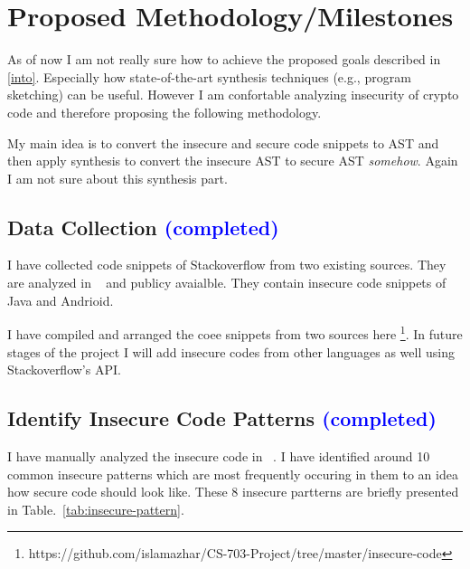 \documentclass[sigconf]{acmart}
\begin{document}
\section{Proposed Methodology/Milestones}
As of now I am not really sure how to achieve the proposed goals described in \cref{into}. Especially how state-of-the-art synthesis techniques (e.g., program sketching) can be useful. However I am confortable analyzing insecurity of crypto code and therefore proposing the following methodology. 

My main idea is to convert the insecure and secure code snippets to AST and then apply synthesis to convert the insecure AST to secure AST \textit{somehow}. Again I am not sure about this synthesis part.  

\subsection{Data Collection \textcolor{blue}{(completed)}} 
I have collected code snippets of Stackoverflow from two existing sources. They are analyzed in ~\cite{fischer2017stack, meng2018secure} and publicy avaialble. 
They contain insecure code snippets of Java and Andrioid. 

I have compiled and arranged the coee snippets from two sources here \footnote{https://github.com/islamazhar/CS-703-Project/tree/master/insecure-code}. In future stages of the project I will add insecure codes from other languages as well using Stackoverflow's API.

\subsection{Identify Insecure Code Patterns \textcolor{blue}{(completed)}}
I have manually analyzed the insecure code in ~\cite{fischer2017stack,meng2018secure}. I have identified around 10 common insecure patterns which are most frequently occuring in them to an idea how secure code should look like. These 8 insecure partterns are briefly presented in Table.~\ref{tab:insecure-pattern}.
\end{document}
